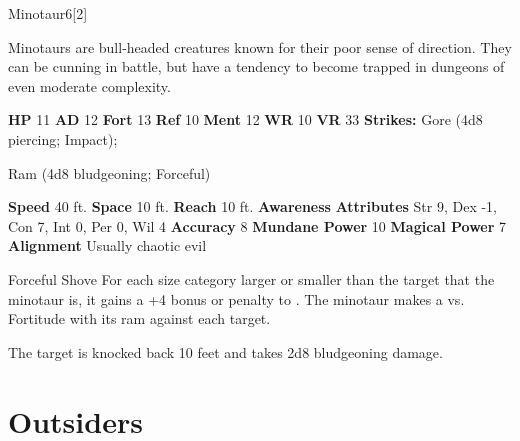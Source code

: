   \begin{monsection}{Minotaur}{6}[2]
    \vspace{-1em}\vspace{-1em}
    \vspace{0em}

    
      Minotaurs are bull-headed creatures known for their poor sense of direction.
      They can be cunning in battle, but have a tendency to become trapped in dungeons of even moderate complexity.
    
    

    \begin{spellcontent}
      \begin{spelltargetinginfo}
        \pari \textbf{HP} 11 \monsep
          \textbf{AD} 12 \monsep
          \textbf{Fort} 13 \monsep
          \textbf{Ref} 10 \monsep
          \textbf{Ment} 12
        \pari \textbf{WR} 10 \monsep
        \textbf{VR} 33
        \pari \textbf{Strikes:}
            Gore  (4d8 piercing; Impact);
\par Ram  (4d8 bludgeoning; Forceful)
      \end{spelltargetinginfo}
    \end{spellcontent}
    \begin{monsterfooter}
      \pari \textbf{Speed} 40 ft. \monsep
        \textbf{Space} 10 ft. \monsep
        \textbf{Reach} 10 ft.
      \pari \textbf{Awareness} 
      \pari \textbf{Attributes}
        Str 9, Dex -1,
        Con 7, Int 0,
        Per 0, Wil 4
      \pari \textbf{Accuracy} 8 \monsep
        \textbf{Mundane Power} 10 \monsep
      \textbf{Magical Power} 7
      \pari \textbf{Alignment} Usually chaotic evil
    \end{monsterfooter}
  \end{monsection}
  \begin{freeability}{Forceful Shove}
      For each size category larger or smaller than the target that the minotaur is, it gains a +4 bonus or penalty to . The minotaur makes a 
         vs. Fortitude
        with its ram against each target.
    
    \hit The target is knocked back 10 feet and takes 2d8 bludgeoning damage.
    \end{freeability}
  
        \section{Outsiders}

